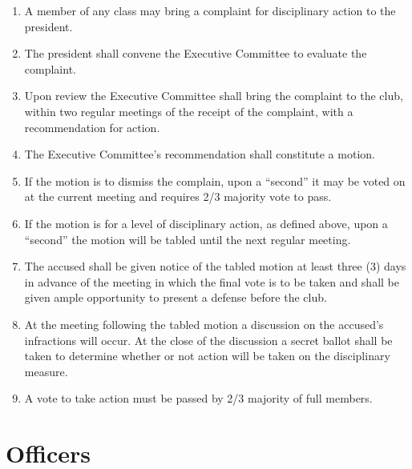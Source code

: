 \documentclass[
]{article}
\providecommand{\tightlist}{%
  \setlength{\itemsep}{0pt}\setlength{\parskip}{0pt}}
\begin{document}
\begin{enumerate}
\begin{enumerate}
    \begin{enumerate}
    \def\labelenumiii{\roman{enumiii}.}
    \tightlist
    \item
      A member of any class may bring a complaint for disciplinary
      action to the president.
    \item
      The president shall convene the Executive Committee to evaluate
      the complaint.
    \item
      Upon review the Executive Committee shall bring the complaint to
      the club, within two regular meetings of the receipt of the
      complaint, with a recommendation for action.
    \item
      The Executive Committee's recommendation shall constitute a
      motion.
    \item
      If the motion is to dismiss the complain, upon a ``second'' it may
      be voted on at the current meeting and requires 2/3 majority vote
      to pass.
    \item
      If the motion is for a level of disciplinary action, as defined
      above, upon a ``second'' the motion will be tabled until the next
      regular meeting.
    \item
      The accused shall be given notice of the tabled motion at least
      three (3) days in advance of the meeting in which the final vote
      is to be taken and shall be given ample opportunity to present a
      defense before the club.
    \item
      At the meeting following the tabled motion a discussion on the
      accused's infractions will occur. At the close of the discussion a
      secret ballot shall be taken to determine whether or not action
      will be taken on the disciplinary measure.
    \item
      A vote to take action must be passed by 2/3 majority of full
      members.
    \end{enumerate}
  \end{enumerate}
\end{enumerate}

\hypertarget{officers}{%
\section{Officers}\label{officers}}
\end{document}

